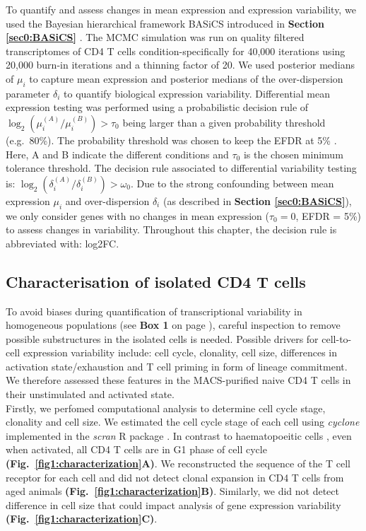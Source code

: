 To quantify and assess changes in mean expression and expression variability, we used the Bayesian hierarchical framework BASiCS introduced in \textbf{Section \ref{sec0:BASiCS}} \citep{Vallejos2015BASiCS, Vallejos2016}. 
The MCMC simulation was run on quality filtered transcriptomes of CD4\plus{} T cells condition-specifically for 40,000 iterations using 20,000 burn-in iterations and a thinning factor of 20. 
We used posterior medians of $\mu_i$ to capture mean expression and posterior medians of the over-dispersion parameter $\delta_i$ to quantify biological expression variability. 
Differential mean expression testing was performed using a probabilistic decision rule of $\log_2(\mu_i^{(A)}/\mu_i^{(B)})>\tau_0$ being larger than a given probability threshold (e.g.~80\%). 
The probability threshold was chosen to keep the EFDR at 5\% \citep{Vallejos2016}. 
Here, A and B indicate the different conditions and $\tau_0$ is the chosen minimum tolerance threshold. 
The decision rule associated to differential variability testing is: $\log_2(\delta_i^{(A)}/\delta_i^{(B)})>\omega_0$. Due to the strong confounding between mean expression $\mu_i$ and over-dispersion $\delta_i$ (as described in \textbf{Section \ref{sec0:BASiCS}}), we only consider genes with no changes in mean expression ($\tau_0=0$, EFDR = 5\%) to assess changes in variability. 
Throughout this chapter, the decision rule is abbreviated with: \gls{log2FC}. 

\newpage

\subsection{Characterisation of isolated CD4\plus{} T cells}
\label{sec1:characterization}

To avoid biases during quantification of transcriptional variability in homogeneous populations (see \textbf{Box 1} on page \pageref{box1}), careful inspection to remove possible substructures in the isolated cells is needed. 
Possible drivers for cell-to-cell expression variability include: cell cycle, clonality, cell size, differences in activation state/exhaustion and T cell priming in form of lineage commitment. 
We therefore assessed these features in the MACS-purified naive CD4\plus{} T cells in their unstimulated and activated state.\\

Firstly, we perfomed computational analysis to determine cell cycle stage, clonality and cell size. We estimated the cell cycle stage of each cell using \emph{cyclone} \citep{Scialdone2015} implemented in the \emph{scran} R package \citep{Lun2016}. 
In contrast to haematopoeitic cells \citep{Kowalczyk2015}, even when activated, all CD4\plus{} T cells are in G1 phase of cell cycle \textbf{(Fig.~\ref{fig1:characterization}A)}. 
We reconstructed the sequence of the T cell receptor for each cell \citep{Stubbington2015} and did not detect clonal expansion in CD4\plus{} T cells from aged animals \textbf{(Fig.~\ref{fig1:characterization}B)}. 
Similarly, we did not detect difference in cell size that could impact analysis of gene expression variability \textbf{(Fig.~\ref{fig1:characterization}C)}. \\

